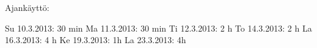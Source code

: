 Ajankäyttö:

Su 10.3.2013: 30 min
Ma 11.3.2013: 30 min
Ti 12.3.2013: 2 h
To 14.3.2013: 2 h
La 16.3.2013: 4 h
Ke 19.3.2013: 1h
La 23.3.2013: 4h

